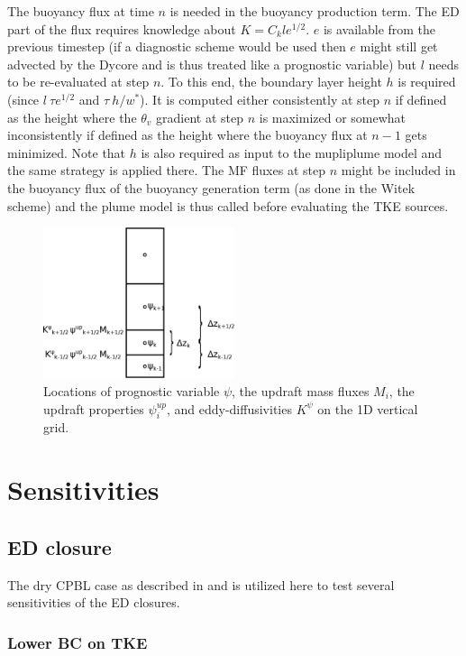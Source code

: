 \documentclass[dvipdfmx,a4paper,10pt]{article}
\begin{document}
The buoyancy flux at time $n$ is needed in the buoyancy production term. The ED part of the flux requires knowledge about $K=C_k l e^{1/2}$. $e$ is available from the previous timestep (if a diagnostic scheme would be used then $e$ might still get advected by the Dycore and is thus treated like a prognostic variable) but $l$ needs to be re-evaluated at step $n$. To this end, the boundary layer height $h$ is required (since $l~ \tau e^{1/2}$ and $\tau ~ h/w^*$). It is computed either consistently at step $n$ if defined as the height where the $\theta_v$ gradient at step $n$ is maximized or somewhat inconsistently if defined as the height where the buoyancy flux at $n-1$ gets minimized.  Note that $h$ is also required as input to the mupliplume model and the same strategy is applied there. The MF fluxes at step $n$ might be included in the buoyancy flux of the buoyancy generation term (as done in the Witek scheme) and the plume model is thus called before evaluating the TKE sources.


\begin{figure}[bthp]
\centering
 \includegraphics[width=0.5\textwidth]{staggering.eps}
\caption{Locations of prognostic variable $\psi$, the updraft mass fluxes $M_i$, the updraft properties $\psi^{up}_i$, and eddy-diffusivities $K^{\psi}$ on the 1D vertical grid. } \label{fig:staggering}
\end{figure}

\section{Sensitivities}
\subsection{ED closure}

The dry CPBL case as described in \cite{nieuwstadt93} and \cite{witek11} is utilized here to test several sensitivities of the ED closures. 

\subsubsection{Lower BC on TKE}
\end{document}
